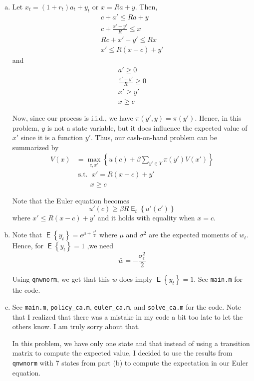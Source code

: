 \documentclass[12pt]{article}
\newcommand{\1}{{\bf 1}} %
\DeclareMathOperator{\E}{\mathsf{E}} %
\newcommand{\Ex}[1]{\E\left\{#1\right\}} %
\DeclareMathOperator{\subjectto}{{s.t.\ }} %
\newcommand{\cbra}[1]{\left\{ #1 \right\}}
\begin{document}
\begin{enumerate}[(a)]
	\item
	
	Let $x_t = (1+r_t)a_t+y_{t}$ or $x=Ra+y$. Then,
	\begin{align*}
		c+a'\leq Ra+y\\
		c+\frac{x'-y'}{R}\leq x\\
		Rc+{x'-y'}\leq Rx\\
		x'\leq R(x-c)+y'
	\end{align*}
	and
	\begin{align*}
	a'\geq 0\\
	\frac{x'-y'}{R}\geq 0\\
	{x'}\geq y'\\
	x\geq c
	\end{align*}
	
	Now, since our process is i.i.d., we have $\pi(y',y) = \pi(y')$. Hence, in this problem, $y$ is not a state variable, but it does influence the expected value of $x'$ since it is a function $y'$. Thus, our cash-on-hand problem can be summarized by
	\begin{align*}
		V(x)& = \max_{c,x'}\cbra{u(c)+\beta \sum_{y'\in Y}\pi(y')V(x')}\\
		&\subjectto  x'= R(x-c)+y' \\
		&\qquad  x\geq c
	\end{align*}
	
	Note that the Euler equation becomes 
	\[
	u'(c)\geq \beta R \E_t\cbra{u'(c')}
	\]
	where $x'\leq R(x-c)+y'$ and it holds with equality when $x= c$.
	
	\item
	
	Note that $\Ex{y_t}=e^{\mu+\frac{\sigma^2}{2}}$ where $\mu$ and $\sigma^2$ are the expected moments of $w_t$. Hence, for $\Ex{y_t}=1$ ,we need
	\[
	\bar{w}=-\frac{\sigma_\epsilon^2}{2}
	\]
	
	Using \texttt{qnwnorm}, we get that this $\bar{w}$ does imply $\Ex{y_t}=1$. See \texttt{main.m} for the code.
	
	\item
	
	See \texttt{main.m}, \texttt{policy\_ca.m}, \texttt{euler\_ca.m}, and \texttt{solve\_ca.m} for the code. Note that I realized that there was a mistake in my code a bit too late to let the others know. I am truly sorry about that.
	
	In this problem, we have only one state and that instead of using a transition matrix to compute the expected value, I decided to use the results from \texttt{qnwnorm} with 7 states from part (b) to compute the expectation in our Euler equation.
	

\end{enumerate}
\end{document}
